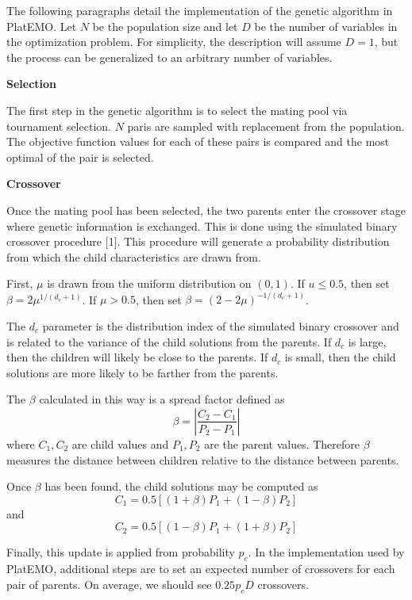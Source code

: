 \documentclass[11pt,a4paper]{article}
\begin{document}
The following paragraphs detail the implementation of the genetic algorithm in PlatEMO. Let $N$ be the population size and let $D$ be the number of variables in the optimization problem. For simplicity, the description will assume $D=1$, but the process can be generalized to an arbitrary number of variables.

\begin{flushleft}
\textbf{Selection}
\end{flushleft}
The first step in the genetic algorithm is to select the mating pool via tournament selection. $N$ paris are sampled with replacement from the population. The objective function values for each of these pairs is compared and the most optimal of the pair is selected.

\begin{flushleft}
\textbf{Crossover}
\end{flushleft}
Once the mating pool has been selected, the two parents enter the crossover stage where genetic information is exchanged. This is done using the simulated binary crossover procedure [1]. This procedure will generate a probability distribution from which the child characteristics are drawn from.

First, $\mu$ is drawn from the uniform distribution on $(0,1)$. If $u \leq 0.5$, then set $\beta = 2\mu^{1/(d_c+1)}$. If $\mu > 0.5$, then set $\beta = (2-2\mu)^{-1/(d_c+1)}$. 

The $d_c$ parameter is the distribution index of the simulated binary crossover and is related to the variance of the child solutions from the parents. If $d_c$ is large, then the children will likely be close to the parents.  If $d_c$ is small, then the child solutions are more likely to be farther from the parents.

The $\beta$ calculated in this way is a spread factor defined as 
$$
\beta = \left| \frac{C_2 - C_1}{P_2 - P_1} \right|
$$
where $C_1, C_2$ are child values and $P_1, P_2$ are the parent values. Therefore $\beta$ measures the distance between children relative to the distance between parents.

Once $\beta$ has been found, the child solutions may be computed as
$$
C_1 = 0.5\left[(1+\beta)P_1 + (1-\beta)P_2 \right]
$$
and 
$$
C_2 = 0.5\left[(1-\beta)P_1 + (1+\beta)P_2 \right]
$$

Finally, this update is applied from probability $p_c$. In the implementation used by PlatEMO, additional steps are to set an expected number of crossovers for each pair of parents. On average, we should see $0.25 p_cD$ crossovers.
\end{document}
